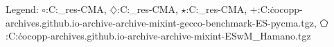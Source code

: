 Legend: {\color{CornflowerBlue}$\circ$}:C:\Users\tristan\Documents\ppsn\BBOB\raw\_res\IC-CMA, {\color{Orange}$\diamondsuit$}:C:\Users\tristan\Documents\ppsn\BBOB\raw\_res\LB-CMA, {\color{Green}$\star$}:C:\Users\tristan\Documents\ppsn\BBOB\raw\_res\LBIC-CMA, {\color{red}+}:C:\Users\tristan\.cocopp\data-archives\numbbo.github.io\data-archive\data-archive\bbob-mixint-gecco-benchmark\CMA-ES-pycma.tgz, {\color{magenta}$\pentagon$}:C:\Users\tristan\.cocopp\data-archives\numbbo.github.io\data-archive\data-archive\bbob-mixint\CMA-ESwM\_Hamano.tgz